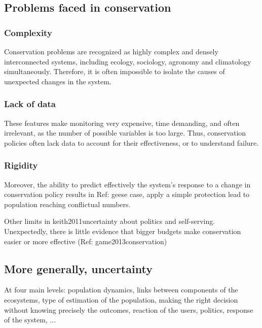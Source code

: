 \documentclass[12pt,a4paper]{article}
\begin{document}
\subsection{Problems faced in conservation}

\subsubsection{Complexity}
Conservation problems are recognized as highly complex and densely interconnected systems, including ecology, sociology, agronomy and climatology simultaneously.
Therefore, it is often impossible to isolate the causes of unexpected changes in the system.

\subsubsection{Lack of data}
These features make monitoring very expensive, time demanding, and often irrelevant, as the number of possible variables is too large.
Thus, conservation policies often lack data to account for their effectiveness, or to understand failure.

\subsubsection{Rigidity}
Moreover, the ability to predict effectively the system's response to a change in conservation policy results in 
Ref: geese case, apply a simple protection lead to population reaching conflictual numbers.

Other limits in keith2011uncertainty about politics and self-serving.
Unexpectedly, there is little  evidence that bigger budgets make conservation easier or more effective (Ref: game2013conservation)

\subsection{More generally, uncertainty}
At four main levels: population dynamics, links between components of the ecosystems, type of estimation of the population, making the right decision without knowing precisely the outcomes, reaction of the users, politics, response of the system, ...
\end{document}
